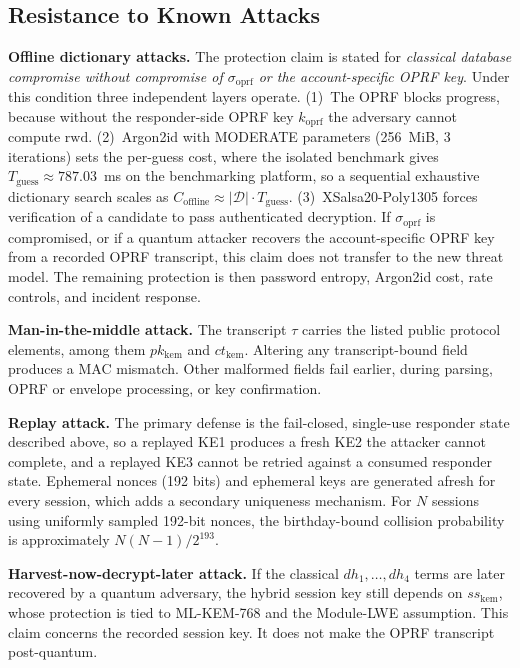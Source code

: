 \documentclass[preprint,12pt]{elsarticle}
\newcommand{\sigoprf}{\sigma_{\mathrm{oprf}}}
\theoremstyle{remark}
\begin{document}
\subsection{Resistance to Known Attacks}

\textbf{Offline dictionary attacks.} The protection claim is stated for \emph{classical database compromise without compromise of $\sigoprf$ or the account-specific OPRF key}. Under this condition three independent layers operate. (1)~The OPRF blocks progress, because without the responder-side OPRF key $k_{\mathrm{oprf}}$ the adversary cannot compute $\mathrm{rwd}$. (2)~Argon2id with MODERATE parameters (256~MiB, 3 iterations) sets the per-guess cost, where the isolated benchmark gives $T_{\mathrm{guess}} \approx 787.03$~ms on the benchmarking platform, so a sequential exhaustive dictionary search scales as $C_{\mathrm{offline}} \approx |\mathcal{D}| \cdot T_{\mathrm{guess}}$. (3)~XSalsa20-Poly1305 forces verification of a candidate to pass authenticated decryption. If $\sigoprf$ is compromised, or if a quantum attacker recovers the account-specific OPRF key from a recorded OPRF transcript, this claim does not transfer to the new threat model. The remaining protection is then password entropy, Argon2id cost, rate controls, and incident response.

\textbf{Man-in-the-middle attack.} The transcript $\tau$ carries the listed public protocol elements, among them $pk_{\mathrm{kem}}$ and $ct_{\mathrm{kem}}$. Altering any transcript-bound field produces a MAC mismatch. Other malformed fields fail earlier, during parsing, OPRF or envelope processing, or key confirmation.

\textbf{Replay attack.} The primary defense is the fail-closed, single-use
responder state described above, so a replayed KE1 produces a fresh KE2 the
attacker cannot complete, and a replayed KE3 cannot be retried against a
consumed responder state. Ephemeral nonces (192 bits) and ephemeral keys are
generated afresh for every session, which adds a secondary uniqueness mechanism.
For $N$ sessions using uniformly sampled 192-bit nonces, the birthday-bound
collision probability is approximately $N(N-1)/2^{193}$.

\textbf{Harvest-now-decrypt-later attack.} If the classical
$dh_1,\ldots,dh_4$ terms are later recovered by a quantum adversary, the
hybrid session key still depends on $ss_{\mathrm{kem}}$, whose protection is
tied to ML-KEM-768 and the Module-LWE assumption. This claim concerns the
recorded session key. It does not make the OPRF transcript post-quantum.
\end{document}
